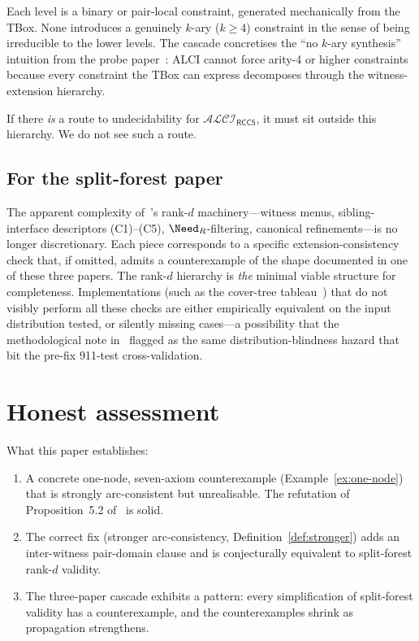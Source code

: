 \documentclass[11pt]{article}
\theoremstyle{definition}
\theoremstyle{remark}
\newcommand{\ALCIRCC}[1]{\mathcal{ALCI}_{\mathsf{RCC#1}}}
\begin{document}
Each level is a binary or pair-local constraint, generated
mechanically from the TBox.  None introduces a genuinely $k$-ary
($k \geq 4$) constraint in the sense of being irreducible to the
lower levels.  The cascade concretises the ``no $k$-ary synthesis''
intuition from the probe paper~\cite{PatchworkProbe}: ALCI cannot
force arity-4 or higher constraints because every constraint the
TBox can express decomposes through the witness-extension hierarchy.

If there \emph{is} a route to undecidability for $\ALCIRCC{5}$, it
must sit outside this hierarchy.  We do not see such a route.

\subsection{For the split-forest paper}

The apparent complexity of~\cite{SplitForest}'s rank-$d$
machinery---witness menus, sibling-interface descriptors (C1)--(C5),
$\Need_R$-filtering, canonical refinements---is no longer
discretionary.  Each piece corresponds to a specific
extension-consistency check that, if omitted, admits a
counterexample of the shape documented in one of these three
papers.  The rank-$d$ hierarchy is \emph{the} minimal viable
structure for completeness.  Implementations (such as the cover-tree
tableau~\cite{CoverTree}) that do not visibly perform all these
checks are either empirically equivalent on the input distribution
tested, or silently missing cases---a possibility that the
methodological note in~\cite{CounterEx2} flagged as the
same distribution-blindness hazard that bit the pre-fix 911-test
cross-validation.

\section{Honest assessment}
\label{sec:honest}

What this paper establishes:
\begin{enumerate}
  \item A concrete one-node, seven-axiom counterexample
    (Example~\ref{ex:one-node}) that is strongly arc-consistent but
    unrealisable.  The refutation of Proposition~5.2
    of~\cite{CounterEx2} is solid.
  \item The correct fix (stronger arc-consistency,
    Definition~\ref{def:stronger}) adds an inter-witness
    pair-domain clause and is conjecturally equivalent to
    split-forest rank-$d$ validity.
  \item The three-paper cascade exhibits a pattern: every
    simplification of split-forest validity has a counterexample,
    and the counterexamples shrink as propagation strengthens.
\end{enumerate}
\end{document}
